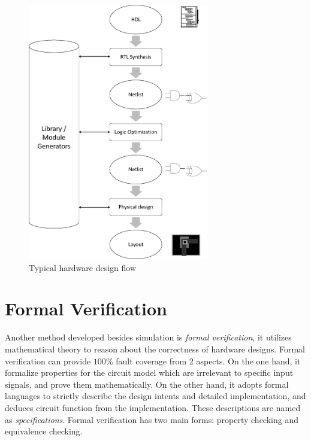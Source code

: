 {
\begin{figure}[h]
\centerline{
\includegraphics[width=0.7\textwidth]{newfig/designflow.eps}
}
\caption{Typical hardware design flow}
\label{fig:designflow}
\end{figure}
}


\section{Formal Verification}
Another method developed besides simulation is \emph{formal verification}, it utilizes 
mathematical theory to reason about the correctness of hardware designs.
Formal verification can provide $100\%$ fault coverage from 2 aspects. On the one hand,  it formalize properties
for the circuit model which are irrelevant to specific input signals,  and prove them mathematically.
On the other hand,  it adopts formal languages to strictly describe the design intents and detailed implementation, 
and deduces circuit function from the implementation. These descriptions are named as {\it specifications}.
Formal verification has two main forms: property checking and equivalence 
checking. 

